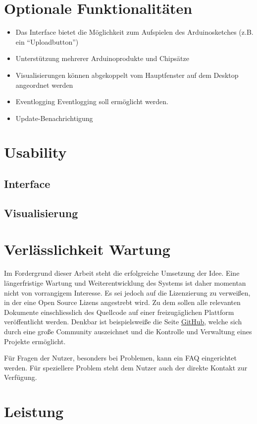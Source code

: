 \section{Optionale Funktionalitäten}
\begin{itemize}
 \item Das Interface bietet die Möglichkeit zum Aufspielen des Arduinosketches (z.B. ein ``Uploadbutton'')
 \item Unterstützung mehrerer Arduinoprodukte und Chipsätze
 \item Visualisierungen können abgekoppelt vom Hauptfenster auf dem Desktop angeordnet werden
 \item Eventlogging \gls{Eventlogging} soll ermöglicht werden.
 \item Update-Benachrichtigung
\end{itemize}

\section{Usability}
\subsection{Interface}
\subsection{Visualisierung}
\section{Verlässlichkeit Wartung}
Im Fordergrund dieser Arbeit steht die erfolgreiche Umsetzung der Idee. Eine längerfristige Wartung und Weiterentwicklung des Systems ist daher momentan nicht von vorrangigem Interesse. Es sei jedoch auf die Lizenzierung zu verweißen, in der eine Open Source Lizens angestrebt wird. Zu dem sollen alle relevanten Dokumente einschliesslich des Quellcode auf einer freizugäglichen Plattform veröffentlicht werden.
Denkbar ist beispielsweiße die Seite \href{https://github.com/}{GitHub}, welche sich durch eine große Community auszeichnet und die Kontrolle und Verwaltung eines Projekte ermöglicht.

Für Fragen der Nutzer, besonders bei Problemen, kann ein \acrshort{FAQ} eingerichtet werden. Für speziellere Problem steht dem Nutzer auch der direkte Kontakt zur Verfügung.
\section{Leistung}
